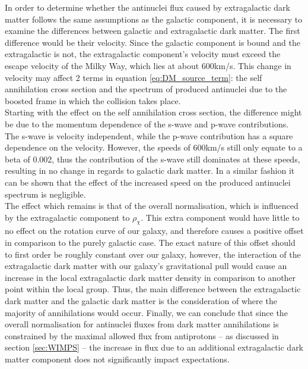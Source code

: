 In order to determine whether the antinuclei flux caused by extragalactic dark matter follows the same assumptions as the galactic component, it is necessary to examine the differences between galactic and extragalactic dark matter. The first difference would be their velocity. Since the galactic component is bound and the extragalactic is not, the extragalactic component's velocity must exceed the escape velocity of the Milky Way, which lies at about 600km/s. This change in velocity may affect 2 terms in equation \ref{eq:DM_source_term}: the self annihilation cross section and the spectrum of produced antinuclei due to the boosted frame in which the collision takes place. \\
Starting with the effect on the self annihilation cross section, the difference might be due to the momentum dependence of the s-wave and p-wave contributions. The s-wave is velocity independent, while the p-wave contribution has a square dependence on the velocity. However, the speeds of 600km/s still only equate to a beta of 0.002, thus the contribution of the s-wave still dominates at these speeds, resulting in no change in regards to galactic dark matter. In a similar fashion it can be shown that the effect of the increased speed on the produced antinuclei spectrum is negligible. \\

The effect which remains is that of the overall normalisation, which is influenced by the extragalactic component to $\rho_\chi$. This extra component would have little to no effect on the rotation curve of our galaxy, and therefore causes a positive offset in comparison to the purely galactic case. The exact nature of this offset should to first order be roughly constant over our galaxy, however, the interaction of the extragalactic dark matter with our galaxy's gravitational pull would cause an increase in the local extragalactic dark matter density in comparison to another point within the local group. Thus, the main difference between the extragalactic dark matter and the galactic dark matter is the consideration of where the majority of annihilations would occur. Finally, we can conclude that since the overall normalisation for antinuclei fluxes from dark matter annihilations is constrained by the maximal allowed flux from antiprotons -- as discussed in section \ref{sec:WIMPS} -- the increase in flux due to an additional extragalactic dark matter component does not significantly impact expectations. \\



